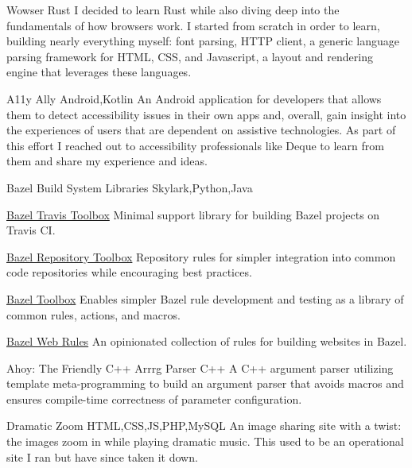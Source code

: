  {Wowser} {Rust} {
    I decided to learn  {Rust} while also diving deep into the fundamentals of how browsers work. I started from scratch in order to learn, building nearly everything myself: font parsing, HTTP client, a generic language parsing framework for HTML, CSS, and Javascript, a layout and rendering engine that leverages these languages.
}

 {A11y Ally} {Android,Kotlin} {
    An Android application for developers that allows them to detect accessibility issues in their own apps and, overall, gain insight into the experiences of users that are dependent on assistive technologies. As part of this effort I reached out to accessibility professionals like  {Deque} to learn from them and share my experience and ideas.
}

\personalProject {} {Bazel Build System Libraries} {Skylark,Python,Java} {
    \begin {minimalItemize}
        \item \href {https://github.com/quittle/bazel_travis_toolbox} {Bazel Travis Toolbox} \spaceemdash Minimal support library for building Bazel projects on Travis CI\@.
        \item \href {https://github.com/quittle/bazel_repository_toolbox} {Bazel Repository Toolbox} \spaceemdash Repository rules for simpler integration into common code repositories while encouraging best practices.
        \item \href {https://github.com/quittle/bazel_toolbox} {Bazel Toolbox} \spaceemdash Enables simpler Bazel rule development and testing as a library of common rules, actions, and macros.
        \item \href {https://github.com/quittle/rules_web} {Bazel Web Rules} \spaceemdash An opinionated collection of rules for building websites in Bazel.
    \end {minimalItemize}
}

 {Ahoy: The Friendly C++ Arrrg Parser} {C++} {
    A C++ argument parser utilizing template meta-programming to build an argument parser that avoids macros and ensures compile-time correctness of parameter configuration.
}

 {Dramatic Zoom} {HTML,CSS,JS,PHP,MySQL} {
    An image sharing site with a twist: the images  {zoom in while playing dramatic music}. This used to be an operational site I ran but have since taken it down.
}

